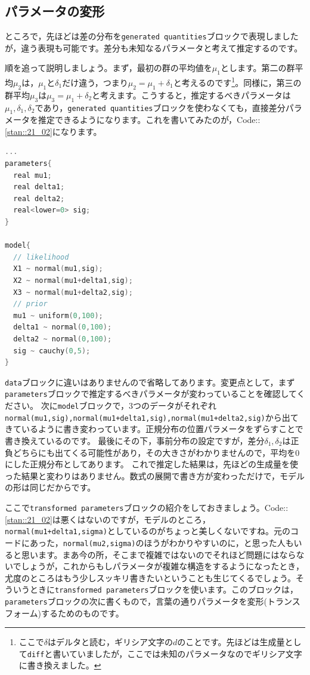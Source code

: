 \documentclass{ltjsbook}
\begin{document}
\subsection{パラメータの変形}
ところで，先ほどは差の分布を\verb|generated quantities|ブロックで表現しましたが，違う表現も可能です。差分も未知なるパラメータと考えて推定するのです。

順を追って説明しましょう。まず，最初の群の平均値を$\mu_1$とします。第二の群平均$\mu_2$は，$\mu_1$と$\delta_1$だけ違う，つまり$\mu_2=\mu_1+\delta_1$と考えるのです\footnote{ここで$\delta$はデルタと読む，ギリシア文字の$d$のことです。先ほどは生成量として\verb|diff|と書いていましたが，ここでは未知のパラメータなのでギリシア文字に書き換えました。}。同様に，第三の群平均$\mu_3$は$\mu_3 = \mu_1+\delta_2$と考えます。こうすると，推定するべきパラメータは$\mu_1,\delta_1,\delta_2$であり，\verb|generated quantities|ブロックを使わなくても，直接差分パラメータを推定できるようになります。これを書いてみたのが，Code::\ref{stan::21_02}になります。

\begin{lstlisting}[language=C++,label={stan::21_02},caption={差分を直接推定するコード}]
...
parameters{
  real mu1;
  real delta1;
  real delta2;
  real<lower=0> sig;
}

model{
  // likelihood
  X1 ~ normal(mu1,sig);
  X2 ~ normal(mu1+delta1,sig);
  X3 ~ normal(mu1+delta2,sig);
  // prior
  mu1 ~ uniform(0,100);
  delta1 ~ normal(0,100);
  delta2 ~ normal(0,100);
  sig ~ cauchy(0,5);
}

\end{lstlisting}

\verb|data|ブロックに違いはありませんので省略してあります。変更点として，まず\verb|parameters|ブロックで推定するべきパラメータが変わっていることを確認してください。
次に\verb|model|ブロックで，3つのデータがそれぞれ\verb|normal(mu1,sig),normal(mu1+delta1,sig),normal(mu1+delta2,sig)|から出てきているように書き変わっています。正規分布の位置パラメータをずらすことで書き換えているのです。
最後にその下，事前分布の設定ですが，差分$\delta_1,\delta_2$は正負どちらにも出てくる可能性があり，その大きさがわかりませんので，平均を0にした正規分布としてあります。
これで推定した結果は，先ほどの生成量を使った結果と変わりはありません。数式の展開で書き方が変わっただけで，モデルの形は同じだからです。

ここで\verb|transformed parameters|ブロックの紹介をしておきましょう。Code::\ref{stan::21_02}は悪くはないのですが，モデルのところ，\verb|normal(mu1+delta1,sigma)|としているのがちょっと美しくないですね。元のコードにあった，\verb|normal(mu2,sigma)|のほうがわかりやすいのに，と思った人もいると思います。まあ今の所，そこまで複雑ではないのでそれほど問題にはならないでしょうが，これからもしパラメータが複雑な構造をするようになったとき，尤度のところはもう少しスッキリ書きたいということも生じてくるでしょう。そういうときに\verb|transformed parameters|ブロックを使います。このブロックは，\verb|parameters|ブロックの次に書くもので，言葉の通りパラメータを変形(トランスフォーム)するためのものです。
\end{document}
